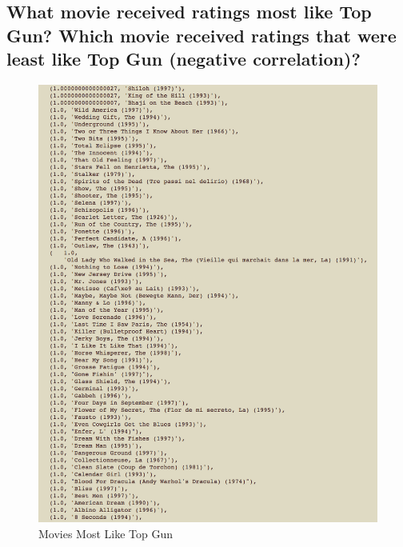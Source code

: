 \documentclass{article}
\begin{document}

\newpage
\subsection{What movie received ratings most like Top Gun? Which movie received ratings that were least like Top Gun (negative correlation)?}

\begin{figure}[H]
\centering
\includegraphics[scale=0.40]{q05/mostliketopgun}
\caption{Movies Most Like Top Gun}
\label{mostliketopgun}
\end{figure}
\end{document}
